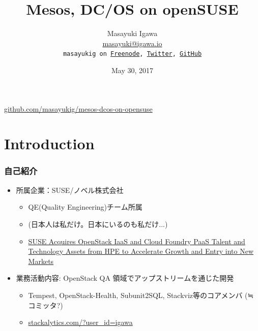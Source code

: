 \documentclass[aspectratio=169,11pt,hyperref={colorlinks=true}]{beamer}
\author[Masayuki Igawa]{%
  \texorpdfstring{%
    \centering
    Masayuki Igawa\\
    \href{mailto:masayuki@igawa.io}{masayuki@igawa.io}\\
    \texttt{masayukig on \href{http://freenode.net/}{Freenode},
     \href{https://twitter.com/masayukig}{Twitter},
     \href{https://github.com/masayukig}{GitHub}}
  }
  {Masayuki Igawa}
}
\date{May 30, 2017}
\title[Mesos, DC/OS on openSUSE
\hspace{2em}\insertframenumber/\inserttotalframenumber]{Mesos, DC/OS on openSUSE}
\begin{document}
{%
\begin{frame}[noframenumbering]
  \hypersetup{colorlinks,urlcolor=suse}
  \titlepage{}
  \centering
  \@place \par
  \href{https://github.com/masayukig/mesos-dcos-on-opensuse}{github.com/masayukig/mesos-dcos-on-opensuse}
\end{frame}
}


\section{Introduction}
\begin{frame}
  \frametitle{自己紹介}
  \begin{itemize}
    \item 所属企業：SUSE/ノベル株式会社
      \begin{itemize}
        \item QE(Quality Engineering)チーム所属
        \item[] (日本人は私だけ。日本にいるのも私だけ...)
        \item \href{https://www.suse.com/newsroom/post/2016/suse-acquires-openstack-iaas-and-cloud-foundry-paas-talent-and-technology-assets-from-hpe-to-accelerate-growth-and-entry-into-new-markets/}{SUSE Acquires OpenStack IaaS and Cloud Foundry PaaS Talent and Technology Assets from HPE to Accelerate Growth and Entry into New Markets}
      \end{itemize}
    \item 業務活動内容: OpenStack QA 領域でアップストリームを通じた開発
      \begin{itemize}
        \item Tempest, OpenStack-Health, Subunit2SQL, Stackviz等のコアメンバ (≒ コミッタ?)
        \item \href{http://stackalytics.com/?user_id=igawa&release=all&metric=all}{stackalytics.com/?user\_id=igawa}
      \end{itemize}
  \end{itemize}
\end{frame}
\end{document}

